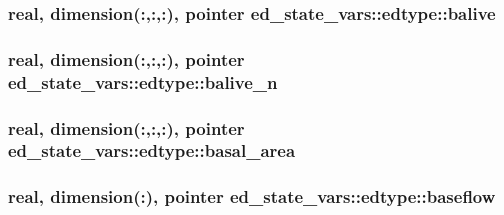 \subsubsection[{\texorpdfstring{balive}{balive}}]{\setlength{\rightskip}{0pt plus 5cm}real, dimension(\+:,\+:,\+:), pointer ed\+\_\+state\+\_\+vars\+::edtype\+::balive}\hypertarget{structed__state__vars_1_1edtype_a3bb8f9f97d580d2917cd0203edd0b56d}{}\label{structed__state__vars_1_1edtype_a3bb8f9f97d580d2917cd0203edd0b56d}
\subsubsection[{\texorpdfstring{balive\+\_\+n}{balive_n}}]{\setlength{\rightskip}{0pt plus 5cm}real, dimension(\+:,\+:,\+:), pointer ed\+\_\+state\+\_\+vars\+::edtype\+::balive\+\_\+n}\hypertarget{structed__state__vars_1_1edtype_acd0df113357dfc0216d463e64c744968}{}\label{structed__state__vars_1_1edtype_acd0df113357dfc0216d463e64c744968}
\subsubsection[{\texorpdfstring{basal\+\_\+area}{basal_area}}]{\setlength{\rightskip}{0pt plus 5cm}real, dimension(\+:,\+:,\+:), pointer ed\+\_\+state\+\_\+vars\+::edtype\+::basal\+\_\+area}\hypertarget{structed__state__vars_1_1edtype_a7f7ef1c8840302bb077a47d2a101ecf4}{}\label{structed__state__vars_1_1edtype_a7f7ef1c8840302bb077a47d2a101ecf4}
\subsubsection[{\texorpdfstring{baseflow}{baseflow}}]{\setlength{\rightskip}{0pt plus 5cm}real, dimension(\+:), pointer ed\+\_\+state\+\_\+vars\+::edtype\+::baseflow}\hypertarget{structed__state__vars_1_1edtype_ab69e0f8b375f296101396a379d260c25}{}\label{structed__state__vars_1_1edtype_ab69e0f8b375f296101396a379d260c25}
